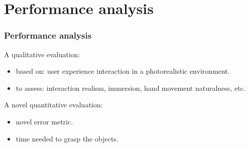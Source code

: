 \documentclass{beamer}
\theoremstyle{remark}
\theoremstyle{plain}
\begin{document}
\section{Performance analysis}

\begin{frame}
\frametitle{Performance analysis}

A qualitative evaluation:
\begin{itemize}
	\item based on: user experience interaction in a photorealistic environment.
	\item to assess: interaction realism, immersion, hand movement naturalness, etc.
\end{itemize}
A novel quantitative evaluation:
\begin{itemize}
	\item novel error metric.
	\item time needed to grasp the objects.
\end{itemize}


\end{frame}
\end{document}
